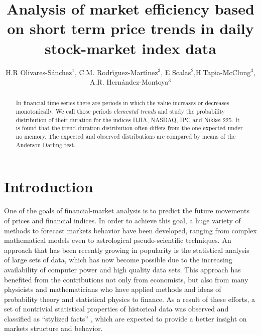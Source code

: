 \documentclass[a4paper]{jpconf}
\begin{document}
\title{Analysis of market efficiency based on short term price trends in daily stock-market index data}

\author{H.R Olivares-S\'anchez$^1$, C.M. Rodr\'{\i}guez-Mart\'{\i}nez$^3$, E Scalas$^2$,H.Tapia-McClung$^3$, A.R. Hern\'andez-Montoya$^3$}

\address{$^1$Facultad de F\'{\i}sica. Universidad Veracruzana, Apdo. Postal 475. Xalapa, Veracruz. M\'{e}xico.}

\address{$^2$Department of Economy, Sussex University.}

\address{$^3$Centro de Investigaci\'on en Inteligencia Artificial. Universidad Veracruzana. Sebasti\'an Camacho 5, Xalapa Veracruz 91000, M\'exico. Tel/Fax: 52-228-8172957/8172855.}



\begin{abstract}
In financial time series there are periods in which the value increases or decreases monotonically. We call those periods {\it elemental trends} and study the probability distribution of their duration for the indices DJIA, NASDAQ, IPC and Nikkei 225. It is found that the trend duration distribution often differs from the one expected under no memory. The expected and observed distributions are compared by means of the Anderson-Darling test.
\end{abstract}

\section{Introduction}
\label{intro}
One of the goals of financial-market analysis is to predict the future movements of prices and financial indices. In order to achieve this goal, a huge variety of methods to forecast markets behavior have been developed, ranging from complex mathematical models even to astrological pseudo-scientific techniques. An approach that has been recently growing in popularity is the statistical analysis of large sets of data, which has now become possible due to the increasing availability of computer power and high quality data sets. This approach has benefited from the contributions not only from economists, but also from many physicists and mathematicians who have applied methods and ideas of probability theory and statistical physics to finance. As a result of these efforts, a set of nontrivial statistical properties of historical data was observed and classified as ``stylized facts'' \cite{Rama}, which are expected to provide a better insight on markets structure and behavior.
\end{document}
